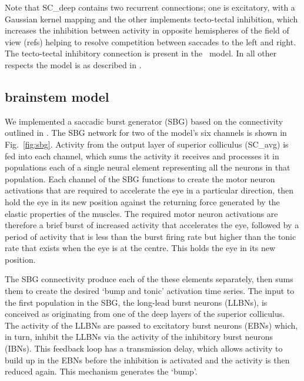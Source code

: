 \documentclass{frontiersSCNS}
\begin{document}
Note that SC\_deep contains two recurrent connections; one is
excitatory, with a Gaussian kernel mapping and the other implements
tecto-tectal inhibition, which increases the inhibition between
activity in opposite hemispheres of the field of view (refs) helping
to resolve competition between saccades to the left and right. The
tecto-tectal inhibitory connection is  present in
the \ccg~model. In all other respects the model is as described in
\cite{cope_basal_2017}.


\subsection{brainstem model}

We implemented a saccadic burst generator (SBG) based
on the connectivity outlined in \cite{gancarz_neural_1998}. The SBG network
for two of the model's
six channels is shown in Fig.~\ref{fig:sbg}. Activity from the output
layer of superior colliculus (SC\_avg) is fed into each channel, which
sums the activity it receives and processes it in populations each of
a single neural element representing all the neurons in that
population. Each channel of the SBG functions to create the motor neuron
activations that are required to accelerate the eye in a particular
direction, then hold the eye in its new position against the returning
force generated by the elastic properties of the muscles.  The
required motor neuron activations are therefore a brief burst of
increased activity that accelerates the eye, followed by a period
of activity that is less than the burst firing rate but higher than
the tonic rate that exists when the eye is at the centre.  This
holds the eye in its new position.

The SBG connectivity produce each of the these elements separately,
then sums them to create the desired `bump and tonic' activation
time series.  The input to the first population in the SBG, the
long-lead burst neurons (LLBNs), is conceived as originating from
one of the deep layers of the superior colliculus.  The activity
of the LLBNs are passed to excitatory burst neurons (EBNs) which,
in turn, inhibit the LLBNs via the activity of the inhibitory
burst neurons (IBNs).  This feedback loop has a transmission delay,
which allows activity to build up in the EBNs before the inhibition
is activated and the activity is then reduced again.  This mechanism
generates the `bump'.
\end{document}
